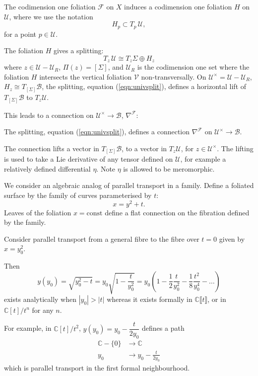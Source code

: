     The codimension one foliation \( \mathcal{F} \) on \(X\) induces a codimension one foliation \(H\) on \( \mathcal{U}\), where we use the notation
    \[ H_p \subset T_p \, \mathcal{U},\]
    for a point \( p\in \mathcal{U}\).
    
    The foliation \(H\) gives a splitting:
    \begin{equation}
    \label{eqn:univsplit}
    T_z \, \mathcal{U} \cong T_z \Sigma \oplus H_z
    \end{equation}
    where \( z \in \mathcal{U} - \mathcal{U}_R\), \( \Pi(z) = [\Sigma]\), and \(\mathcal{U}_R\) is the codimension one set where the foliation \(H\) intersects the vertical foliation \( \mathcal{V}\) non-transversally. On \( \mathcal{U}^{\times} = \mathcal{U} - \mathcal{U}_R\), \( H_z \cong T_{[\Sigma]} \mathcal{B}\), the splitting, equation (\ref{eqn:univsplit}), defines a horizontal lift of \(T_{[\Sigma]}\mathcal{B}\) to \(T_z \mathcal{U}\).


    This leads to a connection on \(\mathcal{U}^{\times} \rightarrow \mathcal{B}\), \( \nabla^{\mathcal{F}}\):
    \begin{lem}
    The splitting, equation (\ref{eqn:univsplit}), defines a connection \( \nabla^{\mathcal{F}}\) on \(\mathcal{U}^{\times} \rightarrow \mathcal{B}\).
    \end{lem}
    
    The connection lifts a vector in \(T_{[\Sigma]}\mathcal{B}\), to a vector in \(T_z \mathcal{U}\), for \(z \in \mathcal{U}^{\times}\). The lifting is used to take a Lie derivative of any tensor defined on \( \mathcal{U}\), for example a relatively defined differential \(\eta\). Note \(\eta\) is allowed to be meromorphic.  
    



    \begin{ex}
    We consider an algebraic analog of parallel transport in a family. Define a foliated surface by the family of curves parameterised by \(t\):
    \[x=y^2+t.\]
    Leaves of the foliation \(x=\mathrm{const}\) define a flat connection on the fibration defined by the family. 
    
    Consider parallel transport from a general fibre to the fibre over \(t=0\) given by \(x=y_0^2\).  
    
    Then
    \[y(y_0)=\sqrt{y_0^2-t}=y_0\sqrt{1-\frac{t}{y_0^2}}=y_0\left(1-\frac{1}{2} \frac{t}{y_0^2}-\frac{1}{8}\frac{t^2}{y_0^4}-\dots \right)\]
    exists analytically when \(|y_0|>|t|\) 
    whereas it exists formally in \( \mathbb{C}\lBrack t \rBrack\), or in  \(\mathbb{C}[t]/t^n\) for any \(n\).  
    
    For example, in \(\mathbb{C}[t]/t^2\), \(y(y_0)=y_0-\dfrac{t}{2y_0}\) defines a path
    \begin{align*}
    \mathbb{C}-\{0\}&\longrightarrow \mathbb{C}\\
    y_0&\longrightarrow y_0-\frac{t}{2y_0}
    \end{align*}
    which is parallel transport in the first formal neighbourhood.  
    \end{ex}


